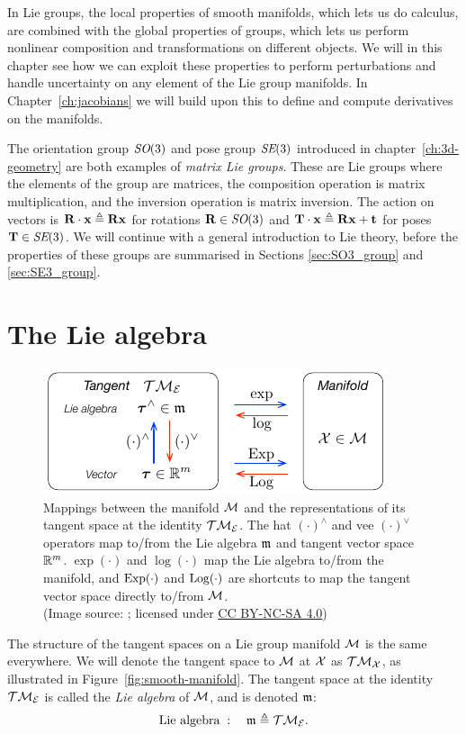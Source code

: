 In Lie groups, the local properties of smooth manifolds, which lets us do calculus, are combined with the global properties of groups, which lets us perform nonlinear composition and transformations on different objects.
We will in this chapter see how we can exploit these properties to perform perturbations and handle uncertainty on any element of the Lie group manifolds.
In Chapter~\ref{ch:jacobians} we will build upon this to define and compute derivatives on the manifolds. 

The orientation group $\textit{SO}(3)$ and pose group $\textit{SE}(3)$ introduced in chapter~\ref{ch:3d-geometry} are both examples of \emph{matrix Lie groups}.
These are Lie groups where the elements of the group are matrices, the composition operation is matrix multiplication, and the inversion operation is matrix inversion.
The action on vectors is ${\boldsymbol{\mathbf{R}}} \cdot {\boldsymbol{\mathbf{x}}} \triangleq {\boldsymbol{\mathbf{R}}} {\boldsymbol{\mathbf{x}}}$ for rotations ${\boldsymbol{\mathbf{R}}} \in \textit{SO}(3)$ and ${\boldsymbol{\mathbf{T}}} \cdot {\boldsymbol{\mathbf{x}}} \triangleq {\boldsymbol{\mathbf{R}}} {\boldsymbol{\mathbf{x}}} + {\boldsymbol{\mathbf{t}}}$ for poses ${\boldsymbol{\mathbf{T}}} \in \textit{SE}(3)$.
We will continue with a general introduction to Lie theory, before the properties of these groups are summarised in Sections \ref{sec:SO3_group} and \ref{sec:SE3_group}.


\section{The Lie algebra}
\begin{figure}[htb]
    \centering
    \includegraphics[width=0.8\columnwidth]{figures/maps.pdf}
    \caption{Mappings between the manifold $\mathcal{M}$ and the representations of its tangent space at the identity $\mathcal{T} \mathcal{M}_{\mathcal{E}}$.
    The hat $(\cdot)^\wedge$ and vee $(\cdot)^\vee$ operators map to/from the Lie algebra ${\mathfrak{m}}$ and tangent vector space ${\mathbb R}^m$. $\exp(\cdot)$ and $\log(\cdot)$ map the Lie algebra to/from the manifold, and $\operatorname*{Exp}(\cdot)$ and $\operatorname*{Log}(\cdot)$ are shortcuts to map the tangent vector space directly to/from $\mathcal{M}$.\\
    (Image source: \cite{SolaARobotics}; licensed under \href{https://creativecommons.org/licenses/by-nc-sa/4.0/}{CC BY-NC-SA 4.0})}
    \label{fig:lie-maps}
\end{figure}
The structure of the tangent spaces on a Lie group manifold $\mathcal{M}$ is the same everywhere.
We will denote the tangent space to $\mathcal{M}$ at $\mathcal{X}$ as $\mathcal{T} \mathcal{M}_{\mathcal{X}}$, as illustrated in Figure~\ref{fig:smooth-manifold}.
The tangent space at the identity $\mathcal{T} \mathcal{M}_{\mathcal{E}}$ is called the \emph{Lie algebra} of $\mathcal{M}$, and is denoted ${\mathfrak{m}}$:
\begin{equation}
  \text{Lie algebra} \; : \quad {\mathfrak{m}} \triangleq \mathcal{T} \mathcal{M}_{\mathcal{E}}.
\end{equation}

